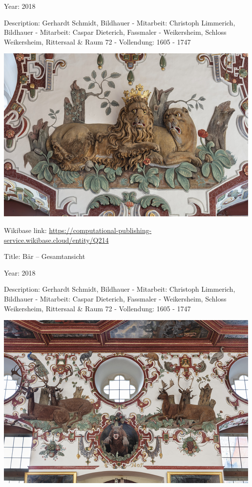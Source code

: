 \documentclass[
  letterpaper,
]{book}
\begin{document}
Year: 2018

Description: Gerhardt Schmidt, Bildhauer - Mitarbeit: Christoph
Limmerich, Bildhauer - Mitarbeit: Caspar Dieterich, Fassmaler -
Weikersheim, Schloss Weikersheim, Rittersaal \& Raum 72 - Vollendung:
1605 - 1747

\includegraphics{paintings_files/figure-pdf/cell-3-output-4.png}

Wikibase link:
\url{https://computational-publishing-service.wikibase.cloud/entity/Q214}

Title: Bär -- Gesamtansicht

Year: 2018

Description: Gerhardt Schmidt, Bildhauer - Mitarbeit: Christoph
Limmerich, Bildhauer - Mitarbeit: Caspar Dieterich, Fassmaler -
Weikersheim, Schloss Weikersheim, Rittersaal \& Raum 72 - Vollendung:
1605 - 1747

\includegraphics{paintings_files/figure-pdf/cell-3-output-6.png}
\end{document}
